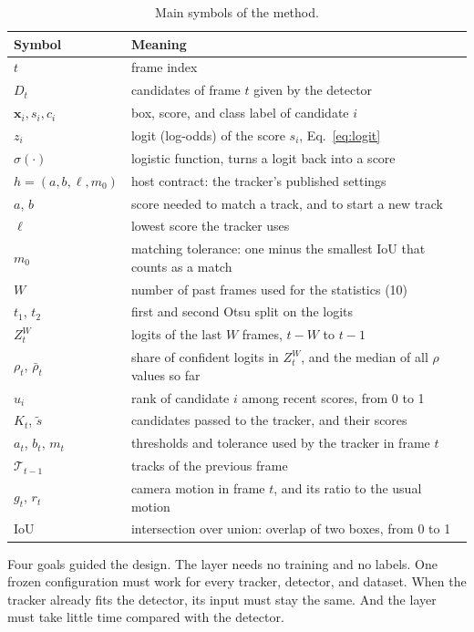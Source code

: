 \begin{table}[t]
\caption{Main symbols of the method.}
\label{tab:symbols}
\centering\footnotesize
\begin{tabular}{@{}l>{\raggedright\arraybackslash}p{51mm}@{}}
\toprule
Symbol & Meaning\\
\midrule
$t$ & frame index\\
$D_t$ & candidates of frame $t$ given by the detector\\
$\mathbf{x}_i, s_i, c_i$ & box, score, and class label of candidate $i$\\
$z_i$ & logit (log-odds) of the score $s_i$, Eq.~\eqref{eq:logit}\\
$\sigma(\cdot)$ & logistic function, turns a logit back into a score\\
$h=(a,b,\ell,m_0)$ & host contract: the tracker's published settings\\
$a$, $b$ & score needed to match a track, and to start a new track\\
$\ell$ & lowest score the tracker uses\\
$m_0$ & matching tolerance: one minus the smallest IoU that counts as a match\\
$W$ & number of past frames used for the statistics (10)\\
$t_1$, $t_2$ & first and second Otsu split on the logits\\
$Z_t^W$ & logits of the last $W$ frames, $t-W$ to $t-1$\\
$\rho_t$, $\bar\rho_t$ & share of confident logits in $Z_t^W$, and the median of all $\rho$ values so far\\
$u_i$ & rank of candidate $i$ among recent scores, from 0 to 1\\
$K_t$, $\tilde{s}$ & candidates passed to the tracker, and their scores\\
$a_t$, $b_t$, $m_t$ & thresholds and tolerance used by the tracker in frame $t$\\
$\mathcal{T}_{t-1}$ & tracks of the previous frame\\
$g_t$, $r_t$ & camera motion in frame $t$, and its ratio to the usual motion\\
IoU & intersection over union: overlap of two boxes, from 0 to 1\\
\bottomrule
\end{tabular}
\end{table}

Four goals guided the design. The layer needs no training and no labels. One
frozen configuration must work for every tracker, detector, and dataset.
When the tracker already fits the detector, its input must stay the same.
And the layer must take little time compared with the detector.

